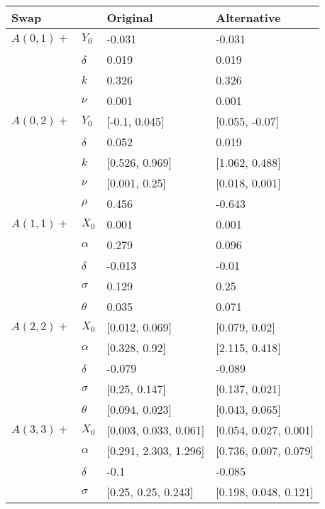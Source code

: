 \begin{tabular}{llll}
	\toprule
	Swap&       &               Original &            Alternative \\
	\midrule
	$A(0, 1)+$ & $Y_0$ &                 -0.031 &                 -0.031 \\
	& $\delta$ &                  0.019 &                  0.019 \\
	& $k$ &                  0.326 &                  0.326 \\
	& $\nu$ &                  0.001 &                  0.001 \\
	$A(0, 2)+$ & $Y_0$ &          [-0.1, 0.045] &         [0.055, -0.07] \\
	& $\delta$ &                  0.052 &                  0.019 \\
	& $k$ &         [0.526, 0.969] &         [1.062, 0.488] \\
	& $\nu$ &          [0.001, 0.25] &         [0.018, 0.001] \\
	& $\rho$ &                  0.456 &                 -0.643 \\
	$A(1, 1)+$ & $X_0$ &                  0.001 &                  0.001 \\
	& $\alpha$ &                  0.279 &                  0.096 \\
	& $\delta$ &                 -0.013 &                  -0.01 \\
	& $\sigma$ &                  0.129 &                   0.25 \\
	& $\theta$ &                  0.035 &                  0.071 \\
	$A(2, 2)+$ & $X_0$ &         [0.012, 0.069] &          [0.079, 0.02] \\
	& $\alpha$ &          [0.328, 0.92] &         [2.115, 0.418] \\
	& $\delta$ &                 -0.079 &                 -0.089 \\
	& $\sigma$ &          [0.25, 0.147] &         [0.137, 0.021] \\
	& $\theta$ &         [0.094, 0.023] &         [0.043, 0.065] \\
	$A(3, 3)+$ & $X_0$ &  [0.003, 0.033, 0.061] &  [0.054, 0.027, 0.001] \\
	& $\alpha$ &  [0.291, 2.303, 1.296] &  [0.736, 0.007, 0.079] \\
	& $\delta$ &                   -0.1 &                 -0.085 \\
	& $\sigma$ &    [0.25, 0.25, 0.243] &  [0.198, 0.048, 0.121] \\

\end{tabular}
